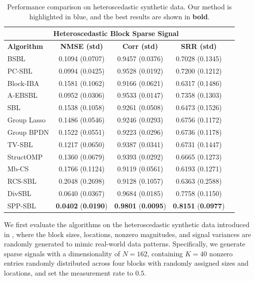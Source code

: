 \documentclass[lettersize,journal]{IEEEtran}
\theoremstyle{remark}
\begin{document}
\begin{table}[!t]
	\centering
	\caption{Performance comparison on heteroscedastic synthetic data. Our method is highlighted in \colorbox{customblue}{blue}, and the best results are shown in \textbf{bold}. }
	\label{tab:heteroscedastic}
	\begin{tabularx}{\linewidth}{lcccc}
		\toprule
		\multicolumn{4}{c}{\textbf{Heteroscedastic Block Sparse Signal}}\\
		\midrule
		\textbf{Algorithm} & \textbf{NMSE (std)} & \textbf{Corr (std)} & \textbf{SRR (std)} \\
		\midrule
		BSBL          & 0.1094 (0.0707) & 0.9457 (0.0376) & 0.7028 (0.1345) \\
		PC-SBL        & 0.0994 (0.0425) & 0.9528 (0.0192) & 0.7200 (0.1212) \\
		Block-IBA     & 0.1581 (0.1062) & 0.9166 (0.0621)& 0.6317 (0.1486) \\
		A-EBSBL       & 0.0952 (0.0306) & 0.9533 (0.0147) & 0.7358 (0.1303) \\
		SBL           & 0.1538 (0.1058) & 0.9261 (0.0508)& 0.6473 (0.1526)  \\
		Group Lasso   & 0.1486 (0.0546) & 0.9246 (0.0293) & 0.6756 (0.1172) \\
		Group BPDN    & 0.1522 (0.0551) & 0.9223 (0.0296)& 0.6736 (0.1178)  \\
		TV-SBL   & 0.1217 (0.0650) & 0.9387 (0.0341) & 0.6731 (0.1447) \\
		StructOMP     & 0.1360 (0.0679) & 0.9393 (0.0292) & 0.6665 (0.1273)\\
		Mb-CS  &  0.1766 (0.1124) & 0.9119 (0.0561) & 0.6193 (0.1271)\\
		RCS-SBL  &  0.2048 (0.2698) & 0.9128 (0.1057) & 0.6363 (0.2588)\\
		DivSBL        & 0.0640 (0.0367) & 0.9684 (0.0185)& 0.7758 (0.1150) \\
		\rowcolor{customblue}
		SPP-SBL       & \textbf{0.0402} (\textbf{0.0190}) & \textbf{0.9801} (\textbf{0.0095}) & \textbf{0.8151} (\textbf{0.0977}) \\
		\bottomrule
	\end{tabularx}
\end{table}

 We first evaluate the algorithms on the heteroscedastic synthetic data introduced in \cite{NEURIPS2024_ead542f1}, where the block sizes, locations, nonzero magnitudes, and signal variances are randomly generated to mimic real-world data patterns.  
Specifically, we generate sparse signals with a dimensionality of \(N = 162\), containing \(K = 40\) nonzero entries randomly distributed across four blocks with randomly assigned sizes and locations, and set the measurement rate to $0.5$.
\end{document}
